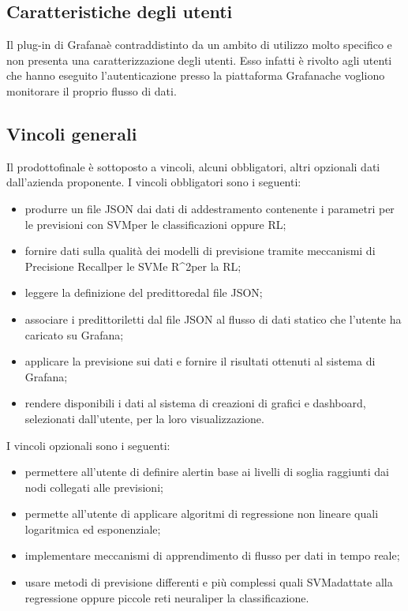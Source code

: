 	\subsection{Caratteristiche degli utenti}
	Il plug-in di Grafana\glosp è contraddistinto da un ambito di utilizzo molto specifico e non presenta una caratterizzazione degli utenti. Esso infatti è rivolto agli utenti che hanno eseguito l'autenticazione presso la piattaforma Grafana\glosp che vogliono monitorare il proprio flusso di dati.
	\subsection{Vincoli generali}
	Il prodotto\glosp finale è sottoposto a vincoli, alcuni obbligatori, altri opzionali dati dall'azienda proponente.
	I vincoli obbligatori sono i seguenti:
	\begin{itemize}
		\item produrre un file JSON dai dati di addestramento contenente i parametri per le previsioni con SVM\glosp per le classificazioni oppure RL\glo;
		\item fornire dati sulla qualità dei modelli di previsione tramite meccanismi di Precision\glosp e Recall\glosp per le SVM\glosp e R\^{}2\glosp per la RL\glo;
		\item leggere la definizione del predittore\glosp dal file JSON;
		\item associare i predittori\glosp letti dal file JSON al flusso di dati statico che l'utente ha caricato su Grafana\glo;
		\item applicare la previsione sui dati e fornire il risultati ottenuti al sistema di Grafana\glo;
		\item rendere disponibili i dati al sistema di creazioni di grafici e dashboard\glo, selezionati dall'utente, per la loro visualizzazione.
	\end{itemize}
	I vincoli opzionali sono i seguenti:
	\begin{itemize}
		\item permettere all'utente di definire alert\glosp in base ai livelli di soglia raggiunti dai nodi collegati alle previsioni;
		\item permette all'utente di applicare algoritmi di regressione non lineare quali logaritmica ed esponenziale;
		\item implementare meccanismi di apprendimento di flusso per dati in tempo reale;
		\item usare metodi di previsione differenti e più complessi quali SVM\glosp adattate alla regressione oppure piccole reti neurali\glosp per la classificazione.
	\end{itemize}
